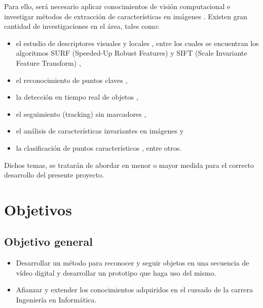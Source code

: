 \documentclass[a4paper,11pt,spanish]{article}
\begin{document}
Para ello, será necesario aplicar conocimientos de visión computacional \cite{citeulike:3484001, citeulike:9456628, bb1919} e investigar métodos de 
extracción de características en imágenes \cite{Nixon:2002:FEI}. Existen gran cantidad de investigaciones en el área, tales como:
\begin{itemize}
 \item el estudio de descriptores visuales \cite{BouGar} y locales \cite{bb53077, TuytelaarsM07, BenhimaneNGGNM08}, entre los cuales se encuentran los algoritmos SURF (Speeded-Up Robust Features) \cite{Bay:2008:SRF, Bay:2008:SRF} y SIFT (Scale Invariante Feature Transform) \cite{bb48614},
 \item el reconocimiento de puntos claves \cite{bb36798},
 \item la detección en tiempo real de objetos \cite{conf/cvpr/HinterstoisserLIFN10},
 \item el seguimiento (tracking) sin marcadores \cite{5607509},
 \item el análisis de características invariantes en imágenes \cite{conf/ismar/2004, Lowe2004} y
 \item la clasificación de puntos característicos \cite{oai:infoscience.epfl.ch:52666}, entre otros.
\end{itemize}
Dichos temas, se tratarán de abordar en menor o mayor medida para el correcto desarrollo del presente proyecto.

\section{Objetivos}
\subsection{Objetivo general}
  \begin{itemize}
      \item Desarrollar un método para reconocer y seguir objetos en una secuencia de vídeo digital y desarrollar un prototipo que haga uso del mismo.
      \item Afianzar y extender los conocimientos adquiridos en el cursado de la carrera Ingeniería en Informática.
  \end{itemize}
\end{document}
